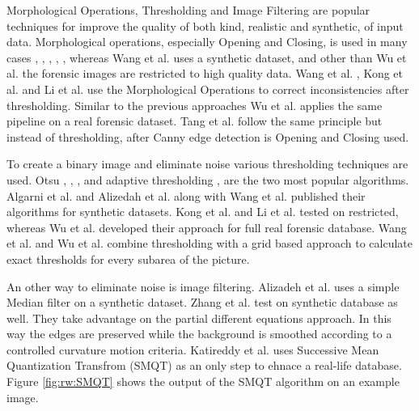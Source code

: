 \documentclass[draft,final]{vutinfth} %
\begin{document}
\par
Morphological Operations, Thresholding and Image Filtering are popular techniques for improve the quality of both kind, realistic and synthetic, of input data.
Morphological operations, especially Opening and Closing, is used in many cases \cite{wang2014automatic}, \cite{kong2014novel}
, \cite{li2014retrieval}, \cite{tang2010footwear}, \cite{wu2019crime}, whereas Wang et al. \cite{wang2014automatic} uses a synthetic dataset, and other than Wu et al. \cite{wu2019crime} the forensic images are restricted to high quality data.
 Wang et al. \cite{wang2014automatic}, Kong et al.  \cite{kong2014novel} and Li et al. \cite{li2014retrieval} use the Morphological Operations to correct inconsistencies after thresholding.
Similar to the previous approaches Wu et al. \cite{wu2019crime} applies the same pipeline on a real forensic dataset.
Tang et al. \cite{tang2010footwear} follow the same principle but instead of thresholding, after Canny edge detection is Opening and Closing used.
\par
To create a binary image and eliminate noise various thresholding techniques are used.
Otsu  \cite{wu2019crime}, \cite{algarni2008novel}, \cite{alizadeh2017automatic}, \cite{kong2014novel} and adaptive thresholding \cite{wang2014automatic}, \cite{li2014retrieval} are the two most popular algorithms.
Algarni et al. \cite{algarni2008novel} and Alizedah et al. \cite{alizadeh2017automatic} along with Wang et al. \cite{wang2014automatic} published their algorithms for synthetic datasets.
Kong et al. \cite{kong2014novel} and Li et al. \cite{li2014retrieval} tested on restricted, whereas Wu et al. \cite{wu2019crime} developed their approach for full real forensic database.
Wang et al. \cite{wang2014automatic} and Wu et al. \cite{wu2019crime} combine thresholding with a grid based approach to calculate exact thresholds for every subarea of the picture.
\par
An other way to eliminate noise is image filtering.
Alizadeh et al. \cite{alizadeh2017automatic} uses a simple Median filter on a synthetic dataset.
Zhang et al. \cite{zhang2005automatic} test on synthetic database as well.
They take advantage on the partial different equations approach.
In this way the edges are preserved while the background is smoothed according to a controlled curvature motion criteria. 
Katireddy et al. \cite{katireddy2017novel} uses Successive Mean Quantization Transfrom (SMQT) \cite{nilsson2013smqt} as an only step to ehnace a real-life database.
Figure \ref{fig:rw:SMQT} shows the output of the SMQT algorithm on an example image.
\end{document}
